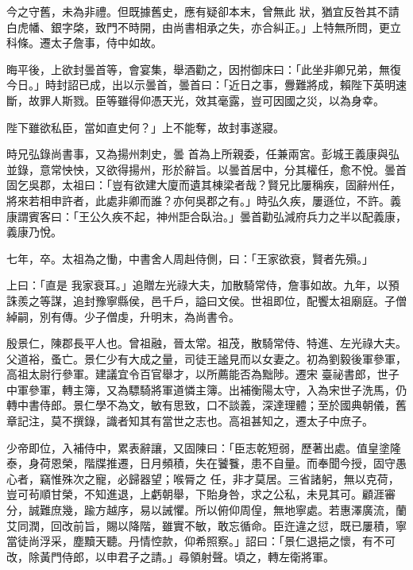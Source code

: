 \begin{pinyinscope}
 今之守舊，未為非禮。但既據舊史，應有疑卻本末，曾無此
 狀，猶宜反咎其不請白虎幡、銀字棨，致門不時開，由尚書相承之失，亦合糾正。」上特無所問，更立科條。遷太子詹事，侍中如故。



 晦平後，上欲封曇首等，會宴集，舉酒勸之，因拊御床曰：「此坐非卿兄弟，無復今日。」時封詔已成，出以示曇首，曇首曰：「近日之事，釁難將成，賴陛下英明速斷，故罪人斯戮。臣等雖得仰憑天光，效其毫露，豈可因國之災，以為身幸。



 陛下雖欲私臣，當如直史何？」上不能奪，故封事遂寢。



 時兄弘錄尚書事，又為揚州刺史，曇
 首為上所親委，任兼兩宮。彭城王義康與弘並錄，意常怏怏，又欲得揚州，形於辭旨。以曇首居中，分其權任，愈不悅。曇首固乞吳郡，太祖曰：「豈有欲建大廈而遺其棟梁者哉？賢兄比屢稱疾，固辭州任，將來若相申許者，此處非卿而誰？亦何吳郡之有。」時弘久疾，屢遜位，不許。義康謂賓客曰：「王公久疾不起，神州詎合臥治。」曇首勸弘減府兵力之半以配義康，義康乃悅。



 七年，卒。太祖為之慟，中書舍人周赳侍側，曰：「王家欲衰，賢者先殞。」



 上曰：「直是
 我家衰耳。」追贈左光祿大夫，加散騎常侍，詹事如故。九年，以預誅羨之等謀，追封豫寧縣侯，邑千戶，謚曰文侯。世祖即位，配饗太祖廟庭。子僧綽嗣，別有傳。少子僧虔，升明末，為尚書令。



 殷景仁，陳郡長平人也。曾祖融，晉太常。祖茂，散騎常侍、特進、左光祿大夫。父道裕，蚤亡。景仁少有大成之量，司徒王謐見而以女妻之。初為劉毅後軍參軍，高祖太尉行參軍。建議宜令百官舉才，以所薦能否為黜陟。遷宋
 臺祕書郎，世子中軍參軍，轉主簿，又為驃騎將軍道憐主簿。出補衡陽太守，入為宋世子洗馬，仍轉中書侍郎。景仁學不為文，敏有思致，口不談義，深達理體；至於國典朝儀，舊章記注，莫不撰錄，識者知其有當世之志也。高祖甚知之，遷太子中庶子。



 少帝即位，入補侍中，累表辭讓，又固陳曰：「臣志乾短弱，歷著出處。值皇塗隆泰，身荷恩榮，階牒推遷，日月頻積，失在饕餮，患不自量。而奉聞今授，固守愚心者，竊惟殊次之寵，必歸器望；喉脣之
 任，非才莫居。三省諸躬，無以克荷，豈可茍順甘榮，不知進退，上虧朝舉，下貽身咎，求之公私，未見其可。顧涯審分，誠難庶幾，踰方越序，易以誡懼。所以俯仰周偟，無地寧處。若惠澤廣流，蘭艾同潤，回改前旨，賜以降階，雖實不敏，敢忘循命。臣迕違之愆，既已屢積，寧當徒尚浮采，塵黷天聽。丹情悾款，仰希照察。」詔曰：「景仁退挹之懷，有不可改，除黃門侍郎，以申君子之請。」尋領射聲。頃之，轉左衛將軍。




\end{pinyinscope}
